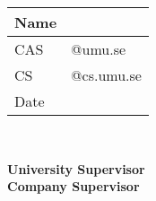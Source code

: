 \begin{titlepage}
	\thispagestyle{empty}
	\noindent {\large \MakeUppercase\university \\
				\instution \\
				\pagetypename \\
			  }

	\begin{center}
	\Large{\textbf{\titleFrontPage}}\\[7pt]

	\Large{\assignmentname}\\[40.0pt]
    
	\begin{tabular}{p{2cm}p{9.5cm}}
		\hline
		Name &  \hfill \name\\\hline
		CAS & \hfill \casuser @umu.se \\\hline
		CS & \hfill \csuser  @cs.umu.se \\\hline
		Date & \hfill \datemade\\ \hline
	\end{tabular}\\
	
    \vfill
    
	\large{\textbf{University Supervisor\\}\usupervisor}
	\large{\textbf{Company Supervisor\\}\csupervisor}
	\end{center}
	\thispagestyle{empty}
\end{titlepage}
